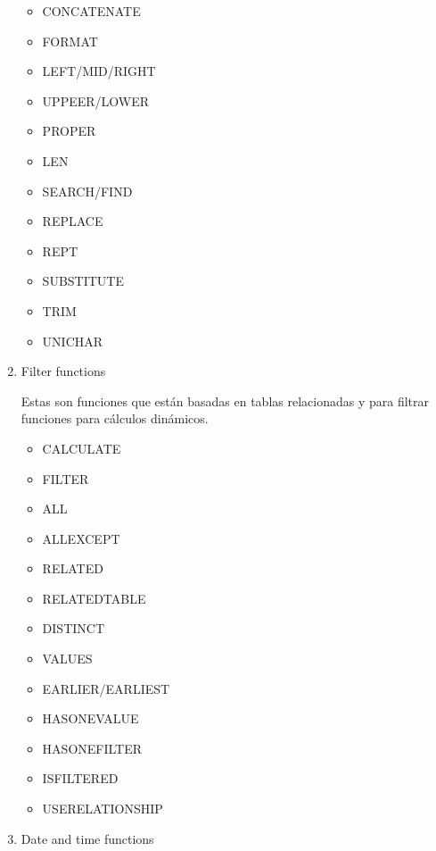 \begin{enumerate}
        \begin{itemize}
            \item CONCATENATE
            \item FORMAT
            \item LEFT/MID/RIGHT
            \item UPPEER/LOWER
            \item PROPER
            \item LEN
            \item SEARCH/FIND
            \item REPLACE
            \item REPT
            \item SUBSTITUTE
            \item TRIM
            \item UNICHAR
        \end{itemize}
    
    \item Filter functions

        Estas son funciones que están basadas en tablas relacionadas y para filtrar funciones para cálculos dinámicos.

        \begin{itemize}
            \item CALCULATE
            \item FILTER
            \item ALL
            \item ALLEXCEPT
            \item RELATED
            \item RELATEDTABLE
            \item DISTINCT
            \item VALUES 
            \item EARLIER/EARLIEST
            \item HASONEVALUE
            \item HASONEFILTER
            \item ISFILTERED
            \item USERELATIONSHIP
        \end{itemize}
        
    \item Date and time functions


\end{enumerate}
